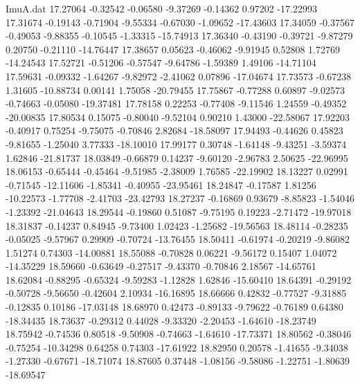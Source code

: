 \begin{filecontents}{ImuA.dat}
  17.27064   -0.32542   -0.06580   -9.37269   -0.14362    0.97202  -17.22993
  17.31674   -0.19143   -0.71904   -9.55334   -0.67030   -1.09652  -17.43603
  17.34059   -0.37567   -0.49053   -9.88355   -0.10545   -1.33315  -15.74913
  17.36340   -0.43190   -0.39721   -9.87279    0.20750   -0.21110  -14.76447
  17.38657    0.05623   -0.46062   -9.91945    0.52808    1.72769  -14.24543
  17.52721   -0.51206   -0.57547   -9.64786   -1.59389    1.49106  -14.71104
  17.59631   -0.09332   -1.64267   -9.82972   -2.41062    0.07896  -17.04674
  17.73573   -0.67238    1.31605  -10.88734    0.00141    1.75058  -20.79455
  17.75867   -0.77288    0.60897   -9.02573   -0.74663   -0.05080  -19.37481
  17.78158    0.22253   -0.77408   -9.11546    1.24559   -0.49352  -20.00835
  17.80534    0.15075   -0.80040   -9.52104    0.90210    1.43000  -22.58067
  17.92203   -0.40917    0.75254   -9.75075   -0.70846    2.82684  -18.58097
  17.94493   -0.44626    0.45823   -9.81655   -1.25040    3.77333  -18.10010
  17.99177    0.30748   -1.64148   -9.43251   -3.59374    1.62846  -21.81737
  18.03849   -0.66879    0.14237   -9.60120   -2.96783    2.50625  -22.96995
  18.06153   -0.65444   -0.45464   -9.51985   -2.38009    1.76585  -22.19902
  18.13227    0.02991   -0.71545  -12.11606   -1.85341   -0.40955  -23.95461
  18.24847   -0.17587    1.81256  -10.22573   -1.77708   -2.41703  -23.42793
  18.27237   -0.16869    0.93679   -8.85823   -1.54046   -1.23392  -21.04643
  18.29544   -0.19860    0.51087   -9.75195    0.19223   -2.71472  -19.97018
  18.31837   -0.14237    0.84945   -9.73400    1.02423   -1.25682  -19.56563
  18.48114   -0.28235   -0.05025   -9.57967    0.29909   -0.70724  -13.76455
  18.50411   -0.61974   -0.20219   -9.86082    1.51274    0.74303  -14.00881
  18.55088   -0.70828    0.06221   -9.56172    0.15407    1.04072  -14.35229
  18.59660   -0.63649   -0.27517   -9.43370   -0.70846    2.18567  -14.65761
  18.62084   -0.88295   -0.65324   -9.59283   -1.12828    1.62846  -15.60410
  18.64391   -0.29192   -0.50728   -9.56650   -0.42604    2.10934  -16.16895
  18.66666    0.42832   -0.77527   -9.31885   -0.12835    0.10186  -17.03148
  18.68970    0.42473   -0.89133   -9.79622   -0.76189    0.64380  -18.34435
  18.73637   -0.29312    0.44028   -9.33320   -2.20453   -1.64610  -18.23749
  18.75942   -0.74536    0.80518   -9.50908   -0.74663   -1.64610  -17.73371
  18.80562   -0.38046   -0.75254  -10.34298    0.64258    0.74303  -17.61922
  18.82950    0.20578   -1.41655   -9.34038   -1.27330   -0.67671  -18.71074
  18.87605    0.37448   -1.08156   -9.58086   -1.22751   -1.80639  -18.69547

\end{filecontents}
